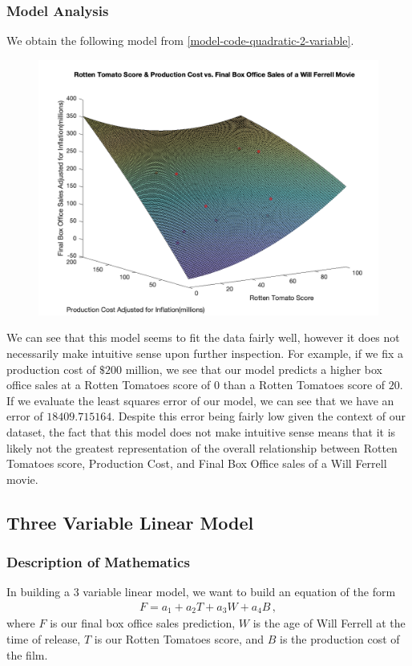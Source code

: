 \documentclass[11pt]{article}
\begin{document}
\subsubsection{Model Analysis}
We obtain the following model from \ref{model-code-quadratic-2-variable}.
\label{two-variable-quadratic-plot}
\begin{figure}[H]
    \centering 
    \includegraphics[width=\textwidth]{models/d.png}
\end{figure}
We can see that this model seems to fit the data fairly well, however it does not necessarily make intuitive sense upon further inspection. 
For example, if we fix a production cost of $\$ 200$ million, we see that our model predicts a higher box office sales at a Rotten Tomatoes score of $0$ than a Rotten Tomatoes score of $20$.
If we evaluate the least squares error of our model, we can see that we have an error of $18409.715164$.  
Despite this error being fairly low given the context of our dataset, the fact that this model does not make intuitive sense means that it is likely not the greatest representation of the overall relationship between Rotten Tomatoes score, Production Cost, and Final Box Office sales of a Will Ferrell movie.

\subsection{Three Variable Linear Model}
\subsubsection{Description of Mathematics}
In building a 3 variable linear model, we want to build an equation of the form
\label{three-var-linear-equation}
\begin{align*}
    F = a_1 + a_2 T + a_3 W + a_4 B \, ,
\end{align*}
where $F$ is our final box office sales prediction, $W$ is the age of Will Ferrell at the time of release, $T$ is our Rotten Tomatoes score, and $B$ is the production cost of the film. 
\\
\end{document}
